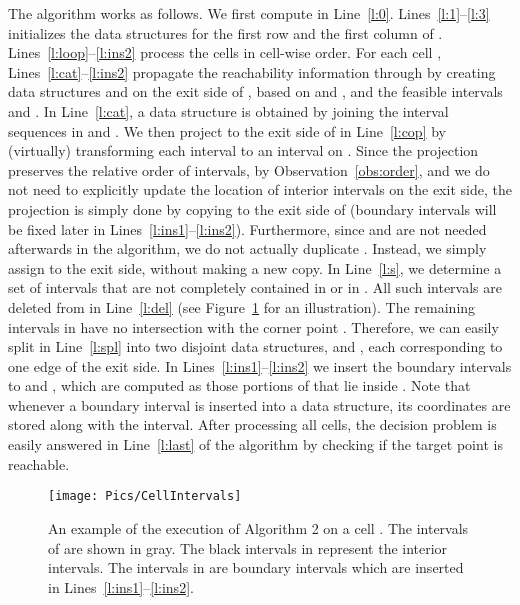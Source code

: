 \documentclass[12pt]{dalthesis}
\begin{document}
The algorithm works as follows.
We first compute  in Line~\ref{l:0}.
Lines~\ref{l:1}--\ref{l:3} initializes the data structures 
for the first row and the first column of .
Lines~\ref{l:loop}--\ref{l:ins2} process the cells in cell-wise order.
For each cell , Lines~\ref{l:cat}--\ref{l:ins2} 
propagate the reachability information through 
by creating data structures  and  on the exit side of , 
based on  and , and the feasible intervals  and .
In Line~\ref{l:cat}, a data structure  is obtained by joining the interval sequences in
 and .
We then project  to the exit side of  in Line~\ref{l:cop}
by (virtually) transforming each interval  to an interval  on .
Since the projection preserves the relative order of intervals,
 by Observation~\ref{obs:order},
and we do not need to explicitly update the location of interior intervals on the exit side,
the projection is simply done by copying  to the exit side of  
(boundary intervals will be fixed later in Lines~\ref{l:ins1}--\ref{l:ins2}).
Furthermore, since  and  are not needed afterwards in the algorithm,
we do not actually duplicate . 
Instead, we simply assign  to the exit side, without making a new copy.
In Line~\ref{l:s}, we determine a set 
of intervals that are not completely contained in  or in .
All such intervals are deleted from  in Line~\ref{l:del}
(see Figure~\ref{fig:cell-intervals} for an illustration).
The remaining intervals in  have no intersection with the corner point .
Therefore, we can easily split  in Line~\ref{l:spl} 
into two disjoint data structures,  and ,
each corresponding to one edge of the exit side.
In Lines~\ref{l:ins1}--\ref{l:ins2} we insert the boundary intervals
to  and ,
which are computed as those portions of  that lie inside .
Note that whenever a boundary interval  is inserted into a data structure,
its coordinates are stored along with the interval.
After processing all cells, the decision problem is easily answered in Line~\ref{l:last}
of the algorithm by checking if the target point  is reachable.

\begin{figure}[t]
	\centering
	\texttt{[image: Pics/CellIntervals]}  
	\caption{An example of the execution of Algorithm 2 on a cell . 
		The intervals of  are shown in gray. 
		The black intervals in  represent the interior intervals.
		The intervals in 	 are boundary intervals 
		which are inserted in Lines~\ref{l:ins1}--\ref{l:ins2}.
	}
	\label{fig:cell-intervals}
\end{figure}
\end{document}

